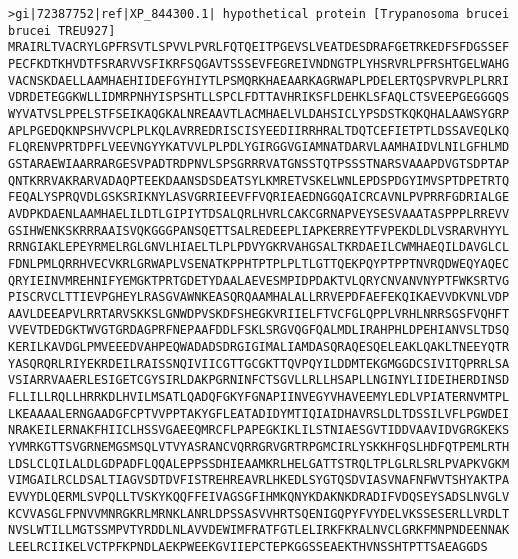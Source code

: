 
\begin{verbatim}
>gi|72387752|ref|XP_844300.1| hypothetical protein [Trypanosoma brucei brucei TREU927]
MRAIRLTVACRYLGPFRSVTLSPVVLPVRLFQTQEITPGEVSLVEATDESDRAFGETRKEDFSFDGSSEF
PECFKDTKHVDTFSRARVVSFIKRFSQGAVTSSSEVFEGREIVNDNGTPLYHSRVRLPFRSHTGELWAHG
VACNSKDAELLAAMHAEHIIDEFGYHIYTLPSMQRKHAEAARKAGRWAPLPDELERTQSPVRVPLPLRRI
VDRDETEGGKWLLIDMRPNHYISPSHTLLSPCLFDTTAVHRIKSFLDEHKLSFAQLCTSVEEPGEGGGQS
WYVATVSLPPELSTFSEIKAQGKALNREAAVTLACMHAELVLDAHSICLYPSDSTKQKQHALAAWSYGRP
APLPGEDQKNPSHVVCPLPLKQLAVRREDRISCISYEEDIIRRHRALTDQTCEFIETPTLDSSAVEQLKQ
FLQRENVPRTDPFLVEEVNGYYKATVVLPLPDLYGIRGGVGIAMNATDARVLAAMHAIDVLNILGFHLMD
GSTARAEWIAARRARGESVPADTRDPNVLSPSGRRRVATGNSSTQTPSSSTNARSVAAAPDVGTSDPTAP
QNTKRRVAKRARVADAQPTEEKDAANSDSDEATSYLKMRETVSKELWNLEPDSPDGYIMVSPTDPETRTQ
FEQALYSPRQVDLGSKSRIKNYLASVGRRIEEVFFVQRIEAEDNGGQAICRCAVNLPVPRRFGDRIALGE
AVDPKDAENLAAMHAELILDTLGIPIYTDSALQRLHVRLCAKCGRNAPVEYSESVAAATASPPPLRREVV
GSIHWENKSKRRRAAISVQKGGGPANSQETTSALREDEEPLIAPKERREYTFVPEKDLDLVSRARVHYYL
RRNGIAKLEPEYRMELRGLGNVLHIAELTLPLPDVYGKRVAHGSALTKRDAEILCWMHAEQILDAVGLCL
FDNLPMLQRRHVECVKRLGRWAPLVSENATKPPHTPTPLPLTLGTTQEKPQYPTPPTNVRQDWEQYAQEC
QRYIEINVMREHNIFYEMGKTPRTGDETYDAALAEVESMPIDPDAKTVLQRYCNVANVNYPTFWKSRTVG
PISCRVCLTTIEVPGHEYLRASGVAWNKEASQRQAAMHALALLRRVEPDFAEFEKQIKAEVVDKVNLVDP
AAVLDEEAPVLRRTARVSKKSLGNWDPVSKDFSHEGKVRIIELFTVCFGLQPPLVRHLNRRSGSFVQHFT
VVEVTDEDGKTWVGTGRDAGPRFNEPAAFDDLFSKLSRGVQGFQALMDLIRAHPHLDPEHIANVSLTDSQ
KERILKAVDGLPMVEEEDVAHPEQWADADSDRGIGIMALIAMDASQRAQESQELEAKLQAKLTNEEYQTR
YASQRQRLRIYEKRDEILRAISSNQIVIICGTTGCGKTTQVPQYILDDMTEKGMGGDCSIVITQPRRLSA
VSIARRVAAERLESIGETCGYSIRLDAKPGRNINFCTSGVLLRLLHSAPLLNGINYLIIDEIHERDINSD
FLLILLRQLLHRRKDLHVILMSATLQADQFGKYFGNAPIINVEGYVHAVEEMYLEDLVPIATERNVMTPL
LKEAAAALERNGAADGFCPTVVPPTAKYGFLEATADIDYMTIQIAIDHAVRSLDLTDSSILVFLPGWDEI
NRAKEILERNAKFHIICLHSSVGAEEQMRCFLPAPEGKIKLILSTNIAESGVTIDDVAAVIDVGRGKEKS
YVMRKGTTSVGRNEMGSMSQLVTVYASRANCVQRRGRVGRTRPGMCIRLYSKKHFQSLHDFQTPEMLRTH
LDSLCLQILALDLGDPADFLQQALEPPSSDHIEAAMKRLHELGATTSTRQLTPLGLRLSRLPVAPKVGKM
VIMGAILRCLDSALTIAGVSDTDVFISTREHREAVRLHKEDLSYGTQSDVIASVNAFNFWVTSHYAKTPA
EVVYDLQERMLSVPQLLTVSKYKQQFFEIVAGSGFIHMKQNYKDAKNKDRADIFVDQSEYSADSLNVGLV
KCVVASGLFPNVVMNRGKRLMRNKLANRLDPSSASVVHRTSQENIGQPYFVYDELVKSSESERLLVRDLT
NVSLWTILLMGTSSMPVTYRDDLNLAVVDEWIMFRATFGTLELIRKFKRALNVCLGRKFMNPNDEENNAK
LEELRCIIKELVCTPFKPNDLAEKPWEEKGVIIEPCTEPKGGSSEAEKTHVNSSHTPTTSAEAGGDS
\end{verbatim}
